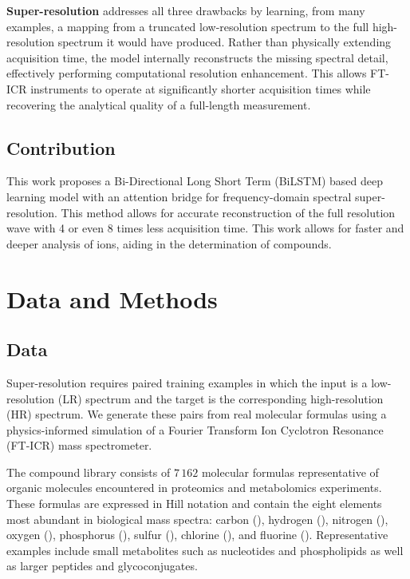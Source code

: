 \documentclass[12pt,a4paper]{report}
\begin{document}
\textbf{Super-resolution} addresses all three drawbacks by learning, from many examples, a mapping from a truncated low-resolution spectrum to the full high-resolution spectrum it would have produced. Rather than physically extending acquisition time, the model internally reconstructs the missing spectral detail, effectively performing computational resolution enhancement. This allows FT-ICR instruments to operate at significantly shorter acquisition times while recovering the analytical quality of a full-length measurement.

\subsection{Contribution}
This work proposes a Bi-Directional\cite{bilstm} Long Short Term \cite{lstm}(BiLSTM) based deep learning model with an attention\cite{vaswani2017} bridge for frequency-domain spectral super-resolution. This method allows for accurate reconstruction of the full resolution wave with 4 or even 8 times less acquisition time. This work allows for faster and deeper analysis of ions, aiding in the determination of compounds.

\section{Data and Methods}

\subsection{Data}
\label{sec:data}

Super-resolution requires paired training examples in which the input is a
low-resolution (LR) spectrum and the target is the corresponding high-resolution
(HR) spectrum.  We generate these pairs from real molecular formulas using a
physics-informed simulation of a Fourier Transform Ion Cyclotron Resonance
(FT-ICR) mass spectrometer.

The compound library consists of $7\,162$ molecular formulas representative of
organic molecules encountered in proteomics and metabolomics experiments.  These
formulas are expressed in Hill notation and contain the eight elements most
abundant in biological mass spectra: carbon (), hydrogen (),
nitrogen (), oxygen (), phosphorus (), sulfur (),
chlorine (), and fluorine ().  Representative examples include
small metabolites such as nucleotides and phospholipids as well as larger
peptides and glycoconjugates.
\end{document}
